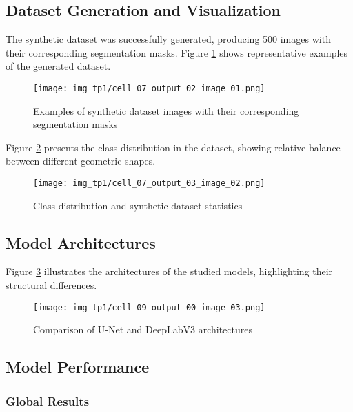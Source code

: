 \documentclass[12pt,a4paper]{article}
\begin{document}
\subsection{Dataset Generation and Visualization}

The synthetic dataset was successfully generated, producing 500 images with their corresponding segmentation masks. Figure \ref{fig:dataset_examples} shows representative examples of the generated dataset.

\begin{figure}[H]
    \centering
    \texttt{[image: img\_tp1/cell\_07\_output\_02\_image\_01.png]}
    \caption{Examples of synthetic dataset images with their corresponding segmentation masks}
    \label{fig:dataset_examples}
\end{figure}

Figure \ref{fig:dataset_distribution} presents the class distribution in the dataset, showing relative balance between different geometric shapes.

\begin{figure}[H]
    \centering
    \texttt{[image: img\_tp1/cell\_07\_output\_03\_image\_02.png]}
    \caption{Class distribution and synthetic dataset statistics}
    \label{fig:dataset_distribution}
\end{figure}

\subsection{Model Architectures}

Figure \ref{fig:model_architectures} illustrates the architectures of the studied models, highlighting their structural differences.

\begin{figure}[H]
    \centering
    \texttt{[image: img\_tp1/cell\_09\_output\_00\_image\_03.png]}
    \caption{Comparison of U-Net and DeepLabV3 architectures}
    \label{fig:model_architectures}
\end{figure}

\subsection{Model Performance}

\subsubsection{Global Results}
\end{document}
